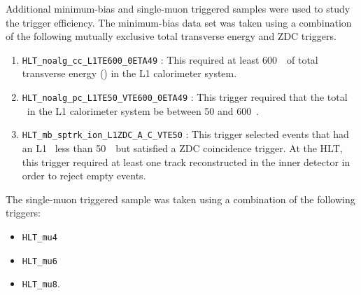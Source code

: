 Additional minimum-bias and single-muon triggered samples were used to study the trigger efficiency. 
The minimum-bias data set was taken using a combination of the following
  mutually exclusive total transverse energy and ZDC triggers. 
\begin{enumerate}
  \item \verb=HLT_noalg_cc_L1TE600_0ETA49= : This required at least 600~\GeV\ 
    of total transverse energy (\ET) in the L1 calorimeter system. 
  \item \verb=HLT_noalg_pc_L1TE50_VTE600_0ETA49= : This trigger required that the 
    total \ET\ in the L1 calorimeter system be between 50 and 600~\GeV.
  \item \verb=HLT_mb_sptrk_ion_L1ZDC_A_C_VTE50= : This trigger selected events that 
    had an L1 \ET\ less than 50~\GeV\ but satisfied a ZDC coincidence trigger. 
    At the HLT, this trigger required at least one track reconstructed in the inner detector 
      in order to reject empty events.
\end{enumerate}
The single-muon triggered sample was taken using a combination of the following triggers:
\begin{itemize}
\item \verb=HLT_mu4=
\item \verb=HLT_mu6=
\item \verb=HLT_mu8=.
\end{itemize}

